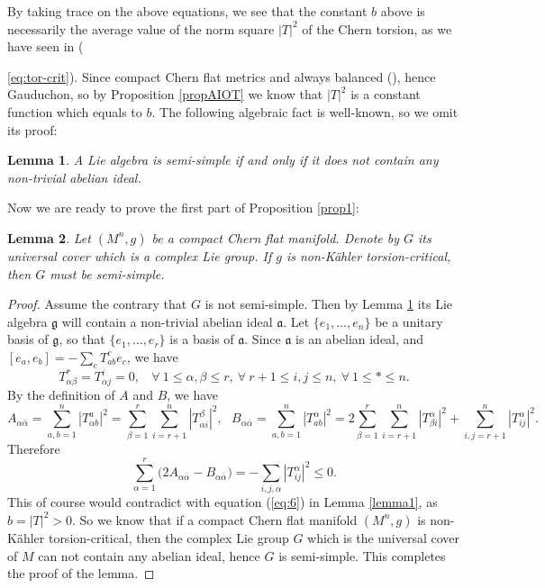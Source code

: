 \documentclass{amsart}
\newtheorem{lemma}{Lemma}
\begin{document}
By taking trace on the above equations, we see that the constant $b$ above is necessarily the average value of the norm square $|T|^2$ of the Chern torsion, as we have seen in ({\ref{eq:tor-crit}). Since compact Chern flat metrics and always balanced (\cite[Theorem 3]{YZ}), hence Gauduchon, so by Proposition \ref{propAIOT} we know that $|T|^2$ is a constant function which equals to $b$. The following algebraic fact is well-known, so we omit its proof:
\begin{lemma} \label{lemma2}
A Lie algebra is semi-simple if and only if it does not contain any non-trivial abelian ideal. 
\end{lemma}




Now we are ready to prove the first part of Proposition \ref{prop1}:
\begin{lemma}  \label{lemma3}
Let $(M^n,g)$ be a compact Chern flat manifold. Denote by $G$ its universal cover which is a complex Lie group. If $g$ is non-K\"ahler torsion-critical, then $G$ must be semi-simple. 
\end{lemma}

\begin{proof}
Assume the contrary that $G$ is not semi-simple. Then by Lemma \ref{lemma2} its Lie algebra ${\mathfrak g}$ will contain a non-trivial abelian ideal ${\mathfrak a}$. Let $\{ e_1, \ldots , e_n\}$ be a unitary basis of ${\mathfrak g}$, so that $\{ e_1, \ldots , e_r\}$ is a basis of ${\mathfrak a}$. Since ${\mathfrak a}$ is an abelian ideal, and $[e_a,e_b]= - \sum_c T^c_{ab}e_c$, we have 
$$  T^{\ast }_{\alpha \beta}=T^i_{\alpha j} =0, \ \ \ \ \forall \ 1\leq \alpha, \beta \leq r, \ \forall \ r+1\leq  i,j\leq n, \ \forall \ 1\leq \ast \leq n.$$
By the definition of $A$ and $B$, we have
$$ A_{\alpha \bar{\alpha}} = \sum_{a,b=1}^n |T^a_{\alpha b}|^2 =  \sum_{\beta =1}^r \sum_{i=r+1}^n |T^{\beta}_{\alpha i}|^2, \ \ \  B_{\alpha \bar{\alpha}} = \sum_{a,b=1}^n |T^{\alpha}_{a b}|^2 =  2\sum_{\beta =1}^r \sum_{i=r+1}^n |T^{\alpha}_{\beta i}|^2 + \sum_{i,j=r+1}^n |T^{\alpha }_{ij}|^2. $$
Therefore
$$ \sum_{\alpha =1}^r \big( 2A_{\alpha \bar{\alpha}}- B_{\alpha \bar{\alpha}}\big) = - \sum_{i,j,\alpha} |T^{\alpha }_{ij}|^2 \leq 0.$$
This of course would contradict with equation (\ref{eq:6}) in Lemma \ref{lemma1}, as $b=|T|^2>0$. So we know that if a compact Chern flat manifold $(M^n,g)$ is non-K\"ahler torsion-critical, then the complex Lie group $G$ which is the universal cover of $M$ can not contain any abelian ideal, hence $G$ is semi-simple. This completes the proof of the lemma.
\end{proof}

}
\end{document}
